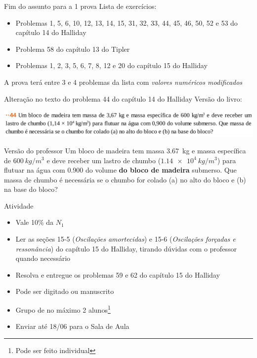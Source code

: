 \documentclass[t,%
brazilian,%
11pt,%
aspectratio=169,%
table%
]{beamer}
\newcommand{\esima}{\textordfeminine }
\begin{document}
\begin{frame}{Fim do assunto para a 1\esima{} prova}
    Lista de exercícios:
    \begin{itemize}
        \item Problemas 1, 5, 6, 10, 12, 13, 14, 15, 31, 32, 33, 44, 45, 46, 50, 52 e 53 do capítulo 14 do Halliday
        \item Problema 58 do capítulo 13 do Tipler
        \item Problemas 1, 2, 3, 5, 6, 7, 8, 12 e 20 do capítulo 15 do Halliday
    \end{itemize}

    A prova terá entre 3 e 4 problemas da lista com \textit{valores numéricos modificados}

\end{frame}

\begin{frame}{Alteração no texto do problema 44 do capítulo 14 do Halliday}
    Versão do livro:
    \begin{center}
        \includegraphics[width=\textwidth]{images/problema 44.png}
    \end{center}

    \begin{block}{Versão do professor}
        Um bloco de madeira tem massa \SI{3.67}{kg} e massa específica de \(\SI{600}{kg/m^3}\)
        e deve receber um lastro de chumbo (\(\SI{1.14e4}{kg/m^3}\)) para flutuar na água
        com \num{0.900} do volume \textbf{do bloco de madeira} submerso. Que massa de chumbo é necessária
        se o chumbo for colado (a) no alto do bloco e (b) na base do bloco?
    \end{block}

\end{frame}

\begin{frame}{Atividade}
    \begin{itemize}
        \item Vale 10\% da \(N_1\)
        \item Ler as seções 15-5 (\textit{Oscilações amortecidas}) e 15-6 
            (\textit{Oscilações forçadas e ressonância}) do capítulo 15 do Halliday, tirando
            dúvidas com o professor quando necessário
        \item Resolva e entregue os problemas 59 e 62 do capítulo 15 do Halliday
        \item Pode ser digitado ou manuscrito
        \item Grupo de no máximo 2 alunos\footnote{Pode ser feito individual}
        \item Enviar até 18/06 para o Sala de Aula
    \end{itemize}
\end{frame}
\end{document}
